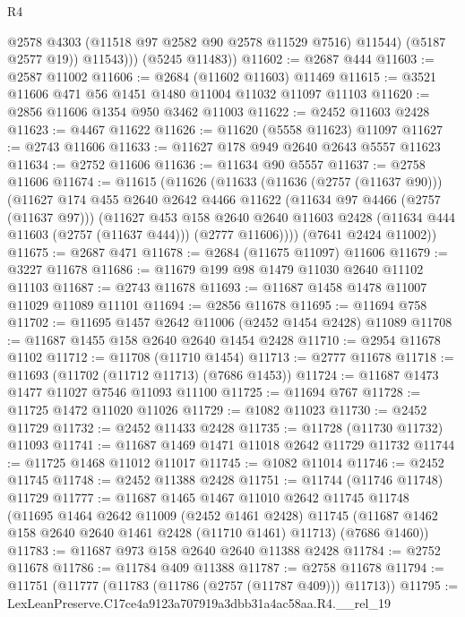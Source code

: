 \begin{lexlean}{R4}
\begin{coremodule}
                @2578
                @4303
                (@11518 @97 @2582 @90 @2578 @11529 @7516)
                @11544)
              (@5187 @2577 @19))
            @11543)))
      (@5245 @11483))
@11602 := @2687 @444
@11603 := @2587 @11002
@11606 := @2684 (@11602 @11603) @11469
@11615 := @3521 @11606 @471 @56 @1451 @1480 @11004 @11032 @11097 @11103
@11620 := @2856 @11606 @1354 @950 @3462 @11003
@11622 := @2452 @11603 @2428
@11623 := @4467 @11622
@11626 := @11620 (@5558 @11623) @11097
@11627 := @2743 @11606
@11633 := @11627 @178 @949 @2640 @2643 @5557 @11623
@11634 := @2752 @11606
@11636 := @11634 @90 @5557
@11637 := @2758 @11606
@11674 := @11615
    (@11626
      (@11633
        (@11636 (@2757 (@11637 @90)))
        (@11627
          @174
          @455
          @2640
          @2642
          @4466
          @11622
          (@11634 @97 @4466 (@2757 (@11637 @97)))
          (@11627
            @453
            @158
            @2640
            @2640
            @11603
            @2428
            (@11634 @444 @11603 (@2757 (@11637 @444)))
            (@2777 @11606))))
      (@7641 @2424 @11002))
@11675 := @2687 @471
@11678 := @2684 (@11675 @11097) @11606
@11679 := @3227 @11678
@11686 := @11679 @199 @98 @1479 @11030 @2640 @11102 @11103
@11687 := @2743 @11678
@11693 := @11687 @1458 @1478 @11007 @11029 @11089 @11101
@11694 := @2856 @11678
@11695 := @11694 @758
@11702 := @11695 @1457 @2642 @11006 (@2452 @1454 @2428) @11089
@11708 := @11687 @1455 @158 @2640 @2640 @1454 @2428
@11710 := @2954 @11678 @1102
@11712 := @11708 (@11710 @1454)
@11713 := @2777 @11678
@11718 := @11693 (@11702 (@11712 @11713) (@7686 @1453))
@11724 := @11687 @1473 @1477 @11027 @7546 @11093 @11100
@11725 := @11694 @767
@11728 := @11725 @1472 @11020 @11026
@11729 := @1082 @11023
@11730 := @2452 @11729
@11732 := @2452 @11433 @2428
@11735 := @11728 (@11730 @11732) @11093
@11741 := @11687 @1469 @1471 @11018 @2642 @11729 @11732
@11744 := @11725 @1468 @11012 @11017
@11745 := @1082 @11014
@11746 := @2452 @11745
@11748 := @2452 @11388 @2428
@11751 := @11744 (@11746 @11748) @11729
@11777 := @11687
    @1465
    @1467
    @11010
    @2642
    @11745
    @11748
    (@11695
      @1464
      @2642
      @11009
      (@2452 @1461 @2428)
      @11745
      (@11687 @1462 @158 @2640 @2640 @1461 @2428 (@11710 @1461) @11713)
      (@7686 @1460))
@11783 := @11687 @973 @158 @2640 @2640 @11388 @2428
@11784 := @2752 @11678
@11786 := @11784 @409 @11388
@11787 := @2758 @11678
@11794 := @11751 (@11777 (@11783 (@11786 (@2757 (@11787 @409))) @11713))
@11795 := LexLeanPreserve.C17ce4a9123a707919a3dbb31a4ac58aa.R4.__rel_19

\end{coremodule}
\end{lexlean}
